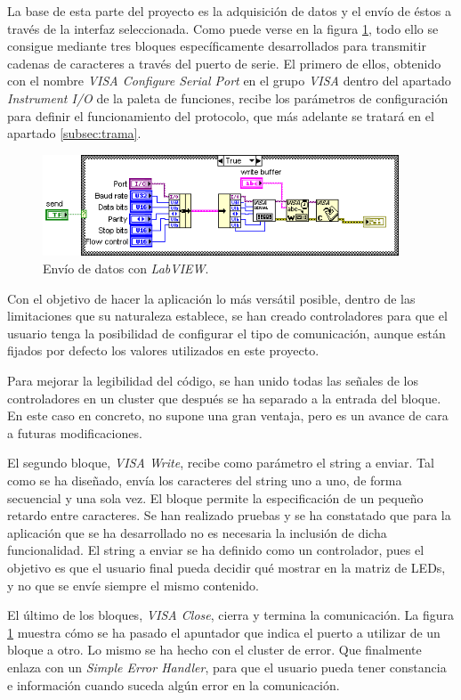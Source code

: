 La base de esta parte del proyecto es la adquisición de datos y el envío de éstos a través de la interfaz seleccionada. Como puede verse en la figura \ref{fig:acher_visa}, todo ello se consigue mediante tres bloques específicamente desarrollados para transmitir cadenas de caracteres a través del puerto de serie. El primero de ellos, obtenido con el nombre \textit{VISA Configure Serial Port} en el grupo \textit{VISA} dentro del apartado \textit{Instrument I/O} de la paleta de funciones, recibe los parámetros de configuración para definir el funcionamiento del protocolo, que más adelante se tratará en el apartado \ref{subsec:trama}.

\begin{figure}[!htp]
\centering
\includegraphics[width=300pt]{./images/acher_visa.png}
\caption{Envío de datos con \textit{LabVIEW}.}
\label{fig:acher_visa}
\end{figure}

Con el objetivo de hacer la aplicación lo más versátil posible, dentro de las limitaciones que su naturaleza establece, se han creado controladores para que el usuario tenga la posibilidad de configurar el tipo de comunicación, aunque están fijados por defecto los valores utilizados en este proyecto.

Para mejorar la legibilidad del código, se han unido todas las señales de los controladores en un cluster que después se ha separado a la entrada del bloque. En este caso en concreto, no supone una gran ventaja, pero es un avance de cara a futuras modificaciones.

El segundo bloque, \textit{VISA Write}, recibe como parámetro el string a enviar. Tal como se ha diseñado, envía los caracteres del string uno a uno, de forma secuencial y una sola vez. El bloque permite la especificación de un pequeño retardo entre caracteres. Se han realizado pruebas y se ha constatado que para la aplicación que se ha desarrollado no es necesaria la inclusión de dicha funcionalidad. El string a enviar se ha definido como un controlador, pues el objetivo es que el usuario final pueda decidir qué mostrar en la matriz de LEDs, y no que se envíe siempre el mismo contenido.

El último de los bloques, \textit{VISA Close}, cierra y termina la comunicación. La figura \ref{fig:acher_visa} muestra cómo se ha pasado el apuntador que indica el puerto a utilizar de un bloque a otro. Lo mismo se ha hecho con el cluster de error. Que finalmente enlaza con un \textit{Simple Error Handler}, para que el usuario pueda tener constancia e información cuando suceda algún error en la comunicación.

